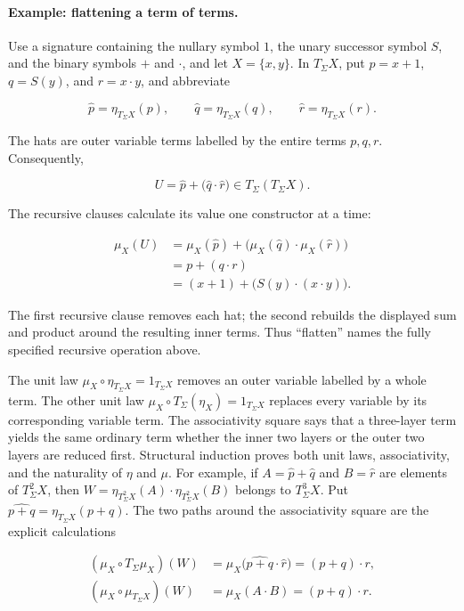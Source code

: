 \documentclass[11pt]{article}
\theoremstyle{definition}
\begin{document}
\paragraph{Example: flattening a term of terms.}
Use a signature containing the nullary symbol \(1\), the unary successor
symbol \(S\), and the binary symbols \(+\) and \(\cdot\), and let
\(X=\{x,y\}\). In
\(T_\Sigma X\), put \(p=x+1\), \(q=S(y)\), and \(r=x\cdot y\), and abbreviate

\[
\widehat p=\eta_{T_\Sigma X}(p),\qquad
\widehat q=\eta_{T_\Sigma X}(q),\qquad
\widehat r=\eta_{T_\Sigma X}(r).
\]

The hats are outer variable terms labelled by the entire terms \(p,q,r\).
Consequently,

\[
U=\widehat p+\bigl(\widehat q\cdot\widehat r\bigr)
\in T_\Sigma(T_\Sigma X).
\]

The recursive clauses calculate its value one constructor at a time:

\[
\begin{aligned}
\mu_X(U)
&=\mu_X(\widehat p)
  +\bigl(\mu_X(\widehat q)\cdot\mu_X(\widehat r)\bigr)\\
&=p+(q\cdot r)\\
&=(x+1)+\bigl(S(y)\cdot(x\cdot y)\bigr).
\end{aligned}
\]

The first recursive clause removes each hat; the second rebuilds the displayed
sum and product around the resulting inner terms. Thus ``flatten'' names the
fully specified recursive operation above.

The unit law \(\mu_X\circ\eta_{T_\Sigma X}=1_{T_\Sigma X}\) removes an outer
variable labelled by a whole term. The other unit law
\(\mu_X\circ T_\Sigma(\eta_X)=1_{T_\Sigma X}\) replaces every variable by
its corresponding variable term. The associativity square says that a
three-layer term yields the same ordinary term whether the inner two layers or
the outer two layers are reduced first. Structural induction proves both unit
laws, associativity, and the naturality of \(\eta\) and \(\mu\). For example, if
\(A=\widehat p+\widehat q\) and \(B=\widehat r\) are elements of
\(T_\Sigma^2X\), then
\(W=\eta_{T_\Sigma^2X}(A)\cdot\eta_{T_\Sigma^2X}(B)\) belongs to
\(T_\Sigma^3X\). Put
\(\widehat{p+q}=\eta_{T_\Sigma X}(p+q)\). The two paths around the
associativity square are the explicit calculations

\[
\begin{aligned}
(\mu_X\circ T_\Sigma\mu_X)(W)
  &=\mu_X\bigl(\widehat{p+q}\cdot\widehat r\bigr)
   =(p+q)\cdot r,\\
(\mu_X\circ\mu_{T_\Sigma X})(W)
  &=\mu_X(A\cdot B)
   =(p+q)\cdot r.
\end{aligned}
\]
\end{document}
